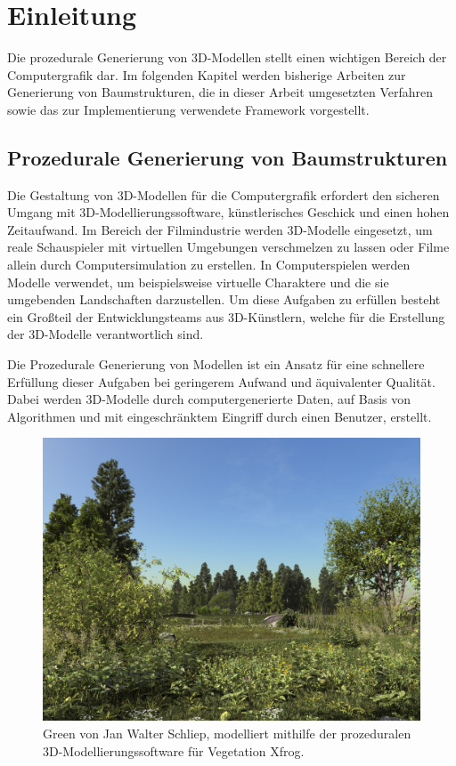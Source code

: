 \chapter{Einleitung}

Die prozedurale Generierung von 3D-Modellen stellt einen wichtigen Bereich der Computergrafik dar. Im folgenden Kapitel werden bisherige Arbeiten zur Generierung von Baumstrukturen, die in dieser Arbeit umgesetzten Verfahren sowie das zur Implementierung verwendete Framework vorgestellt. 

\section{Prozedurale Generierung von Baumstrukturen}

Die Gestaltung von 3D-Modellen für die Computergrafik erfordert den sicheren Umgang mit 3D-Modellierungssoftware, künstlerisches Geschick und einen hohen Zeitaufwand. Im Bereich der Filmindustrie werden 3D-Modelle eingesetzt, um reale Schauspieler mit virtuellen Umgebungen verschmelzen zu lassen oder Filme allein durch Computersimulation zu erstellen. \cite[S.5]{Deussen:05} In Computerspielen werden Modelle verwendet, um beispielsweise virtuelle Charaktere und die sie umgebenden Landschaften darzustellen. Um diese Aufgaben zu erfüllen besteht ein Großteil der Entwicklungsteams aus 3D-Künstlern, welche für die Erstellung der 3D-Modelle verantwortlich sind. \cite[S.3]{PCGiG:16}

Die Prozedurale Generierung von Modellen ist ein Ansatz für eine schnellere Erfüllung dieser Aufgaben bei geringerem Aufwand und äquivalenter Qualität. Dabei werden 3D-Modelle durch computergenerierte Daten, auf Basis von Algorithmen und mit eingeschränktem Eingriff durch einen Benutzer, erstellt. \cite[S.1]{PCGiG:16} 

\begin{figure} [htbp]
	\centering
	\includegraphics[width=.7\textwidth]{images/greenXfrog_JanWalterSchliep.jpg}
	\caption{\glqq Green\grqq{} von Jan Walter Schliep, modelliert mithilfe der prozeduralen 3D-Modellierungssoftware für Vegetation \glqq Xfrog\grqq. \cite{GreenOne:16}}
	\label{fig:greenXfrog_JanWalterSchliep}
\end{figure}

